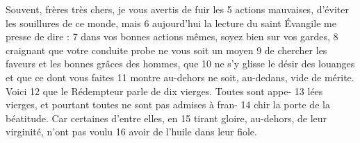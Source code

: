 Souvent, frères très chers, je vous avertis de fuir les	 
5	 	actions mauvaises, d'éviter les souillures de ce monde, mais	 
6	 	aujourd'hui la lecture du saint Évangile me presse de dire :	 
7	 	dans vos bonnes actions mêmes, soyez bien sur vos gardes,	 
8	 	craignant que votre conduite probe ne vous soit un moyen	 
9	 	de chercher les faveurs et les bonnes grâces des hommes, que	 
10	 	ne s'y glisse le désir des louanges et que ce dont vous faites	 
11	 	montre au-dehors ne soit, au-dedans, vide de mérite. Voici	 
12	 	que le Rédempteur parle de dix vierges. Toutes sont appe-	 
13	 	lées vierges, et pourtant toutes ne sont pas admises à fran-	 
14	 	chir la porte de la béatitude. Car certaines d'entre elles, en	 
15	 	tirant gloire, au-dehors, de leur virginité, n'ont pas voulu	 
16	 	avoir de l'huile dans leur fiole.